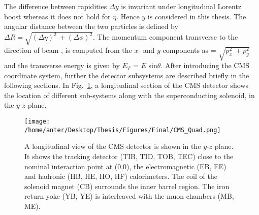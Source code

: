 The difference between rapidities $\Delta y$ is invariant under longitudinal Lorentz boost whereas it does not hold for $\eta$. Hence $y$ is considered in this thesis. The angular distance between the two particles is defined by $\Delta R = \sqrt{(\Delta \eta)^2~\plus (\Delta \phi)^2}$. The momentum component transverse to the direction of beam \pt, is computed from the $x$- and $y$-components as \pt = $\sqrt{p^2_x~\plus p^2_y}$ and the transverse energy is given by $E_T$ = $E$ sin$\theta$. After introducing the CMS coordinate system, further the detector subsystems are described briefly in the following sections. In Fig.~\ref{fig:CMS_quad}, a longitudinal section of the CMS detector shows the location of different sub-systems along with the superconducting solenoid, in the $y$-$z$ plane. 
\begin{figure}[!h]
\vspace*{3mm}
\begin{center} 
\hspace*{-5mm}
\texttt{[image: /home/anter/Desktop/Thesis/Figures/Final/CMS\_Quad.png]}
\vspace*{5mm}
\caption[A longitudinal view of the CMS detector is shown in the $y$-$z$ plane.]{A longitudinal view of the CMS detector is shown in the $y$-$z$ plane\footnotemark. It shows the tracking detector (TIB, TID, TOB, TEC) close to the nominal interaction point at (0,0), the electromagnetic (EB, EE) and hadronic (HB, HE, HO, HF) calorimeters. The coil of the solenoid magnet (CB) surrounds the inner barrel region. The iron return yoke (YB, YE) is interleaved with the muon chambers (MB, ME).}
\label{fig:CMS_quad}
\end{center}
\end{figure}

